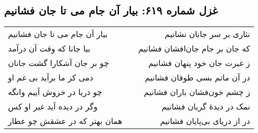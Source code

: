 \begin{center}
\section*{غزل شماره ۶۱۹: بیار آن جام می تا جان فشانیم}
\label{sec:619}
\begin{longtable}{l p{0.5cm} r}
بیار آن جام می تا جان فشانیم
&&
نثاری بر سر جانان نشانیم
\\
بیا جانا که وقت آن درآمد
&&
که جان بر جام جان‌افشان فشانیم
\\
چو بر جان آشکارا گشت جانان
&&
ز غیرت جان خود پنهان فشانیم
\\
دمی کز ما برآید بی غم او
&&
در آن ماتم بسی طوفان فشانیم
\\
چو دریا در خروش آییم وانگه
&&
ز چشم خون‌فشان باران فشانیم
\\
وگر در دیده آید غیر او کس
&&
نمک در دیدهٔ گریان فشانیم
\\
همان بهتر که در عشقش چو عطار
&&
در از دریای بی‌پایان فشانیم
\\
\end{longtable}
\end{center}

